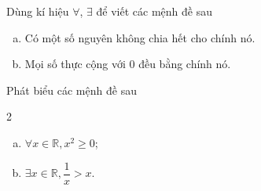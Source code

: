 \begin{bt}%
	Dùng kí hiệu $\forall$, $\exists$ để viết các mệnh đề sau
	\begin{enumerate}[a)]
		\item Có một số nguyên không chia hết cho chính nó.
		\item  Mọi số thực cộng với $0$ đều bằng chính nó.
	\end{enumerate}
\end{bt}

\begin{bt}%
	Phát biểu các mệnh đề sau
	\begin{multicols}{2}
		\begin{enumerate}[a)]
			\item $\forall x \in \mathbb{R}, x^2 \ge 0$;
			\item  $\exists x\in \mathbb{R}, \dfrac{1}{x}>x$.
		\end{enumerate}
	\end{multicols}
	
\end{bt}

